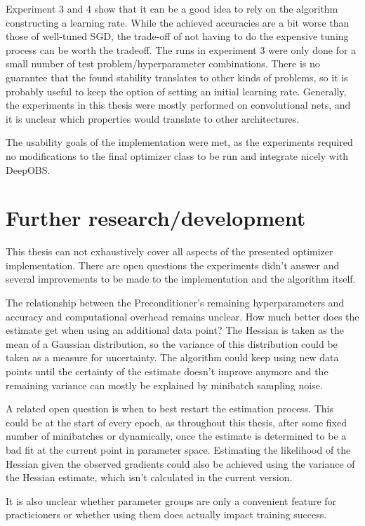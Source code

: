 \documentclass[twoside,12pt,a4paper]{report}
\begin{document}
Experiment 3 and 4 show that it can be a good idea to rely on the algorithm constructing a learning rate. While the achieved accuracies are a bit worse than those of well-tuned SGD, the trade-off of not having to do the expensive tuning process can be worth the tradeoff.
The runs in experiment 3 were only done for a small number of test problem/hyperparameter combinations. There is no guarantee that the found stability translates to other kinds of problems, so it is probably useful to keep the option of setting an initial learning rate.
Generally, the experiments in this thesis were mostly performed on convolutional nets, and it is unclear which properties would translate to other architectures.

The usability goals of the implementation were met, as the experiments required no modifications to the final optimizer class to be run and integrate nicely with DeepOBS.

\section{Further research/development}
This thesis can not exhaustively cover all aspects of the presented optimizer implementation. There are open questions the experiments didn't answer and several improvements to be made to the implementation and the algorithm itself.

The relationship between the Preconditioner's remaining hyperparameters and accuracy and computational overhead remains unclear. How much better does the estimate get when using an additional data point? The Hessian is taken as the mean of a Gaussian distribution, so the variance of this distribution could be taken as a measure for uncertainty. The algorithm could keep using new data points until the certainty of the estimate doesn't improve anymore and the remaining variance can mostly be explained by minibatch sampling noise.

A related open question is when to best restart the estimation process. This could be at the start of every epoch, as throughout this thesis, after some fixed number of minibatches or dynamically, once the estimate is determined to be a bad fit at the current point in parameter space. Estimating the likelihood of the Hessian given the observed gradients could also be achieved using the variance of the Hessian estimate, which isn't calculated in the current version.

It is also unclear whether parameter groups are only a convenient feature for practicioners or whether using them does actually impact training success.
\end{document}
